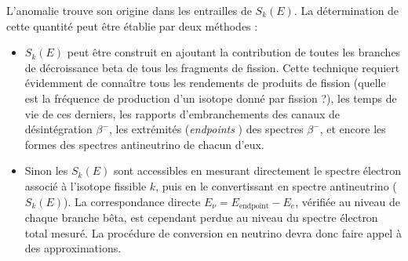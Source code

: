 

L'anomalie trouve son origine dans les entrailles de $S_k(E)$. La détermination de cette quantité peut être établie par deux méthodes :

\begin{itemize}[label=\textbullet]
    \item $S_k(E)$ peut être construit en ajoutant la contribution de toutes les branches de décroissance beta de tous les fragments de fission. Cette technique requiert évidemment de connaître tous les rendements de produits de fission (quelle est la fréquence de production d'un isotope donné par fission ?), les temps de vie de ces derniers, les rapports d'embranchements des canaux de désintégration $\beta^-$, les extrémités (\og \textit{endpoints} \fg{}) des spectres $\beta^-$, et encore les formes des spectres antineutrino de chacun d'eux.
    \item Sinon les $S_k(E)$ sont accessibles en mesurant directement le spectre électron associé à l'isotope fissible $k$, puis en le convertissant en spectre antineutrino ($S_k(E)$). La correspondance directe $E_\nu = E_\textrm{endpoint} - E_e$, vérifiée au niveau de chaque branche bêta, est cependant perdue au niveau du spectre électron total mesuré. La procédure de conversion en neutrino devra donc faire appel à des approximations.
\end{itemize}

